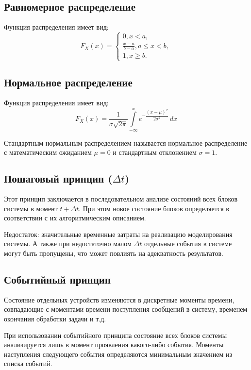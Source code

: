 \subsection{Равномерное распределение}

Функция распределения имеет вид:
\begin{equation}
	F_X(x) = 
	\left\{\begin{array}{l}
		0, x < a, \\
		\frac{x - a}{b - a}, a \leq x < b, \\
		1, x \geq b.
	\end{array}\right.
\end{equation}

\subsection{Нормальное распределение}

Функция распределения имеет вид:
\begin{equation}
	F_X(x) = \frac{1}{\sigma \sqrt{2 \pi}} \int\limits_{-\infty}^x e^{-\dfrac{(x - \mu)^2}{2 \sigma^2}} \,dx
\end{equation}

Стандартным нормальным распределением называется нормальное распределение с математическим ожиданием $\mu = 0$ и стандартным отклонением $\sigma = 1$.

\subsection{Пошаговый принцип ($\Delta t$)}
Этот принцип заключается в последовательном анализе состояний всех блоков системы в момент $t + \Delta t$. При этом новое состояние блоков определяется в соответствии с их алгоритмическим описанием. 

Недостаток: значительные временные затраты на реализацию моделирования системы. А также при недостаточно малом $\Delta t$ отдельные события в системе могут быть пропущены, что может повлиять на адекватность результатов.

\subsection{Событийный принцип}
Состояние отдельных устройств изменяются в дискретные моменты времени, совпадающие с моментами времени поступления сообщений в систему, временем окончания обработки задачи и т.д.

При использовании событийного принципа состояние всех блоков системы анализируется лишь в момент проявления какого-либо события. Моменты наступления следующего события определяются минимальным значением из списка событий.

